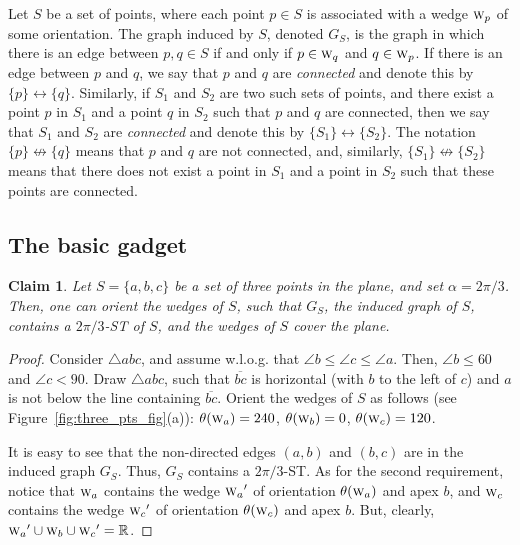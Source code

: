 \documentclass[11pt]{article}
\newtheorem{claim}[theorem]{Claim}
\def\segment#1{{\overline{#1}}}
\def\wedge#1{{\textsc{w}_{#1}}}
\def\orientation#1{{\theta(#1)}}
\def\connected#1#2{\{{#1}\} \leftrightarrow \{{#2}\}}
\def\notconnected#1#2{\{{#1}\} \not\leftrightarrow \{{#2}\}}
\begin{document}
Let $S$ be a set of points, where each point $p \in S$ is associated with a wedge $\wedge{p}$ of some orientation.
The graph induced by $S$, denoted $G_S$, is the graph in which there is an edge between $p,q \in S$ if and only if $p \in \wedge{q}$ and $q \in \wedge{p}$. If there is an edge between $p$ and $q$, we say that $p$ and $q$ are {\em connected} and denote this by $\connected{p}{q}$. Similarly, if $S_1$ and $S_2$ are two such sets of points, and there exist a point $p$ in $S_1$ and a point $q$ in $S_2$ such that $p$ and $q$ are connected, then we say that $S_1$ and $S_2$ are {\em connected} and denote this by $\connected{S_1}{S_2}$. The notation $\notconnected{p}{q}$ means that $p$ and $q$ are not connected, and, similarly, $\notconnected{S_1}{S_2}$ means that there does not exist a point in $S_1$ and a point in $S_2$ such that these points are connected.

\subsection{The basic gadget}\label{sec:orient}

\begin{claim}\label{lem:three_pts}
Let $S=\{a,b,c\}$ be a set of three points in the plane, and set $\alpha=2\pi/3$. Then, one can orient the wedges
of $S$, such that $G_S$, the induced graph of $S$, contains a $2\pi/3$-ST of $S$, and the wedges of $S$ cover
the plane.
\end{claim}

\begin{proof}
Consider $\triangle abc$, and
assume w.l.o.g. that $\angle b \le \angle c \le \angle a$. Then, $\angle b \le 60$ and $\angle c < 90$. Draw $\triangle abc$, such that $\segment{bc}$ is horizontal (with $b$ to the left of $c$) and $a$ is not below the line containing $\segment{bc}$.
Orient the wedges of $S$ as follows (see Figure~\ref{fig:three_pts_fig}(a)): 
$\orientation{\wedge{a}}=240$,
$\orientation{\wedge{b}}=0$,
$\orientation{\wedge{c}}=120$. 

It is easy to see that the non-directed edges $(a,b)$ and $(b,c)$ are in the induced graph $G_S$.
Thus, $G_S$ contains a $2\pi/3$-ST. As for the second requirement, notice that 
$\wedge{a}$ contains the wedge $\wedge{a}'$ of orientation $\orientation{\wedge{a}}$ and apex $b$, and
$\wedge{c}$ contains the wedge $\wedge{c}'$ of orientation $\orientation{\wedge{c}}$ and apex $b$. But, clearly,
$\wedge{a}' \cup \wedge{b} \cup \wedge{c}' = \mathbb{R}$.  
\end{proof}
\end{document}

